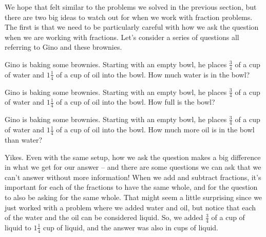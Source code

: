 \documentclass{ximera}
\begin{document}
We hope that felt similar to the problems we solved in the previous section, but there are two big ideas to watch out for when we work with fraction problems. The first is that we need to be particularly careful with how we ask the question when we are working with fractions. Let's consider a series of questions all referring to Gino and these brownies.

\begin{question}
Gino is baking some brownies. Starting with an empty bowl, he places $\frac{3}{4}$ of a cup of water and $1 \frac{1}{4}$ of a cup of oil into the bowl. How much water is in the bowl?

\begin{multipleChoice}
\end{multipleChoice}
\end{question}


\begin{question}
Gino is baking some brownies. Starting with an empty bowl, he places $\frac{3}{4}$ of a cup of water and $1 \frac{1}{4}$ of a cup of oil into the bowl. How full is the bowl?

\begin{multipleChoice}
\end{multipleChoice}
\end{question}


\begin{question}
Gino is baking some brownies. Starting with an empty bowl, he places $\frac{3}{4}$ of a cup of water and $1 \frac{1}{4}$ of a cup of oil into the bowl. How much more oil is in the bowl than water?

\begin{multipleChoice}
\end{multipleChoice}
\end{question}

Yikes. Even with the same setup, how we ask the question makes a big difference in what we get for our answer -- and there are some questions we can ask that we can't answer without more information! When we add and subtract fractions, it's important for each of the fractions to have the same whole, and for the question to also be asking for the same whole. That might seem a little surprising since we just worked with a problem where we added water and oil, but notice that each of the water and the oil can be considered liquid. So, we added $\frac{3}{4}$ of a cup of liquid to $1 \frac{1}{4}$ cup of liquid, and the answer was also in cups of liquid. 
\end{document}
